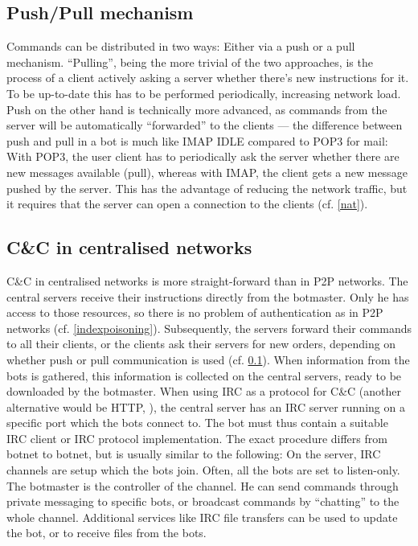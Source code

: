 \documentclass{llncs}
\begin{document}
\subsection{Push/Pull mechanism}
\label{pushpull}
Commands can be distributed in two ways: Either via a push or a pull
mechanism. ``Pulling'', being the more trivial of the two approaches,
is the process of a client actively asking a server whether there's
new instructions for it. To be up-to-date this has to be performed
periodically, increasing network load.  Push on the other hand is
technically more advanced, as commands from the server will be
automatically ``forwarded'' to the clients --- the difference between
push and pull in a bot is much like IMAP IDLE compared to POP3 for
mail: With POP3, the user client has to periodically ask the server
whether there are new messages available (pull), whereas with IMAP,
the client gets a new message pushed by the server. This has the
advantage of reducing the network traffic, but it requires that the
server can open a connection to the clients (cf. \ref{nat}).


\subsection{C\&C in centralised networks}
C\&C in centralised networks is more straight-forward than in P2P
networks. The central servers receive their instructions directly from
the botmaster. Only he has access to those resources, so there is no
problem of authentication as in P2P networks
(cf. \ref{indexpoisoning}). Subsequently, the servers forward their
commands to all their clients, or the clients ask their servers for
new orders, depending on whether push or pull communication is used
(cf. \ref{pushpull}). When information from the bots is gathered, this
information is collected on the central servers, ready to be
downloaded by the botmaster. When using IRC as a protocol for C\&C
(another alternative would be HTTP, \cite{li2009botnet}), the central
server has an IRC server running on a specific port which the bots
connect to. The bot must thus contain a suitable IRC client or IRC
protocol implementation. The exact procedure differs from botnet to
botnet, but is usually similar to the following: On the server, IRC
channels are setup which the bots join. Often, all the bots are set to
listen-only. The botmaster is the controller of the channel. He can
send commands through private messaging to specific bots, or broadcast
commands by ``chatting'' to the whole channel. Additional services
like IRC file transfers can be used to update the bot, or to receive
files from the bots.
\end{document}
